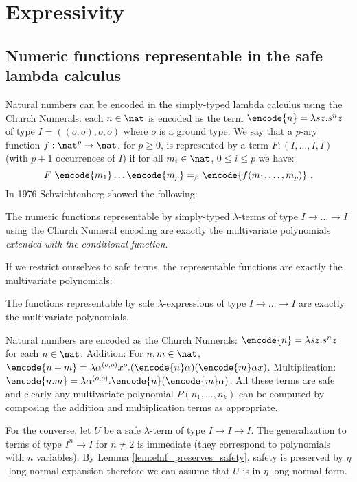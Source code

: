 \allowdisplaybreaks

\section{Expressivity}
\subsection{Numeric functions representable in the safe lambda
calculus}

Natural numbers can be encoded in the simply-typed lambda calculus
using the Church Numerals: each $n\in\nat$ is encoded as the term
$\encode{n} = \lambda s z. s^n z$ of type $I = ((o,o),o,o)$ where
$o$ is a ground type.
We say that a $p$-ary function $f : \nat^p \rightarrow \nat$, for $p \geq 0$,
is represented by a term $F : (I, \ldots, I, I)$ (with $p+1$ occurrences of $I$)
if for all $m_i \in \nat$, $0\leq i\leq p$ we have:
$$F~\encode{m_1} \ldots \encode{m_p} =_\beta \encode{f(m_1,\ldots, m_p)} \ .$$
In 1976 Schwichtenberg \cite{citeulike:622637}
showed the following:


\begin{theorem}[Schwichtenberg 1976]
The numeric functions representable by simply-typed $\lambda$-terms
of type $I\rightarrow \ldots \rightarrow I$ using the Church Numeral
encoding are exactly the multivariate polynomials \emph{extended
with the conditional function}.
\end{theorem}

If we restrict ourselves to safe terms, the representable functions
are exactly the multivariate polynomials:
\begin{theorem}
\label{thm:polychar} The functions representable by safe
$\lambda$-expressions of type $I\rightarrow \ldots \rightarrow I$
are exactly the multivariate polynomials.
\end{theorem}
\proof
  Natural numbers are encoded as the Church Numerals: $\encode{n} =
  \lambda s z. s^n z$ for each $n \in\nat$.  Addition: For $n,m \in \nat$, $\encode{n+m} =
  \lambda \alpha^{(o,o)} x^o . (\encode{n} \alpha) (\encode{m} \alpha
  x)$. Multiplication: $\encode{n . m} = \lambda \alpha^{(o,o)}
  . \encode{n} (\encode{m} \alpha)$.  All these terms are safe and
  clearly any multivariate polynomial $P(n_1, \ldots, n_k)$ can be
  computed by composing the addition and multiplication terms as
  appropriate.

For the converse, let $U$ be a safe $\lambda$-term of type
$I\rightarrow I\rightarrow I$.  The generalization to terms of type
$I^n \rightarrow I$ for $n\neq2$ is immediate (they correspond to
polynomials with $n$ variables). By Lemma
\ref{lem:elnf_preserves_safety}, safety is preserved by $\eta$-long
normal expansion therefore we can assume that $U$ is in $\eta$-long
normal form.



